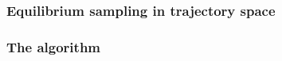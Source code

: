 \documentclass{beamer}
\begin{document}
\begin{frame}
\frametitle{Equilibrium sampling in trajectory space}

\end{frame}
\begin{frame}
\frametitle{The algorithm}

\end{frame}
%
%
%
%
\end{document}
